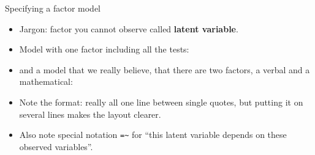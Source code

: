 \begin{frame}[fragile]{Specifying a factor model}
  
  \begin{itemize}

  \item Jargon: factor you cannot observe called \textbf{latent variable}.
  \item Model with one factor including all the tests:
    

\begin{knitrout}
\color{fgcolor}\begin{kframe}
\begin{alltt}
\hlkwb{=}
\end{alltt}
\end{kframe}
\end{knitrout}

\item and a model that we really believe, that there are two factors,
  a verbal and a mathematical:
  

\begin{knitrout}
\color{fgcolor}\begin{kframe}
\begin{alltt}
\hlkwb{=}
\end{alltt}
\end{kframe}
\end{knitrout}
  
\item Note the format: really all one line between single quotes, but
  putting it on several lines makes the layout clearer.
\item Also note special notation \texttt{=\textasciitilde} for ``this latent
  variable depends on these observed variables''.  
    
  \end{itemize}
  
\end{frame}

